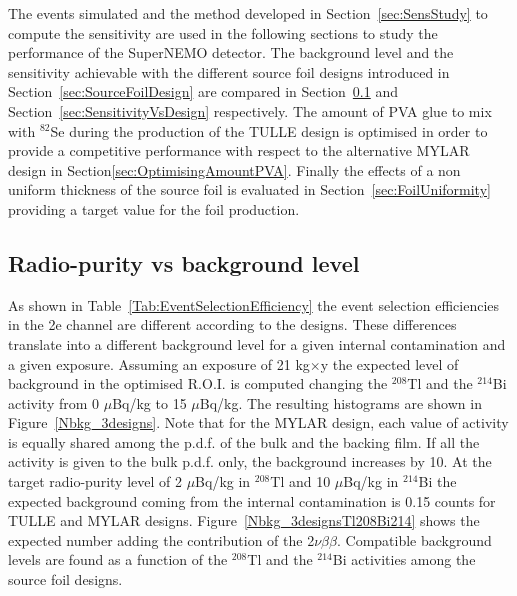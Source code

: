 \documentclass[main.tex]{subfiles}
\begin{document}
\NI The events simulated and the method developed in Section~\ref{sec:SensStudy} to compute the sensitivity are used in the following sections to study the performance of the SuperNEMO detector. The background level and the sensitivity achievable with the different source foil designs introduced in Section~\ref{sec:SourceFoilDesign} are compared in Section~\ref{sec:RadiopurityVsBkg} and Section~\ref{sec:SensitivityVsDesign} respectively. The amount of PVA glue to mix with $^{\text{82}}$Se during the production of the TULLE design is optimised in order to provide a competitive performance with respect to the alternative MYLAR design in Section\ref{sec:OptimisingAmountPVA}. Finally the effects of a non uniform thickness of the source foil is evaluated in Section~\ref{sec:FoilUniformity} providing a target value for the foil production.



\subsection{Radio-purity vs background level}\label{sec:RadiopurityVsBkg}


\NI As shown in Table~\ref{Tab:EventSelectionEfficiency} the event selection efficiencies in the 2e channel are different according to the designs. These differences translate into a different background level for a given internal contamination and a given exposure. Assuming an exposure of 21 kg$\times$y the expected level of background in the optimised R.O.I. is computed changing the $^{\text{208}}$Tl and the $^{\text{214}}$Bi activity from 0 $\mu$Bq/kg to 15 $\mu$Bq/kg. The resulting histograms are shown in Figure~\ref{Nbkg_3designs}. Note that for the MYLAR design, each value of activity is equally shared among the p.d.f. of the bulk and the backing film. If all the activity is given to the bulk p.d.f. only, the background increases by 10. At the target radio-purity level of 2 $\mu$Bq/kg in $^{\text{208}}$Tl and 10 $\mu$Bq/kg in $^{\text{214}}$Bi the expected background coming from the internal contamination is 0.15 counts for TULLE and MYLAR designs. Figure~\ref{Nbkg_3designsTl208Bi214} shows the expected number adding the contribution of the 2$\nu\beta\beta$. Compatible background levels are found as a function of the $^{\text{208}}$Tl and the $^{\text{214}}$Bi activities among the source foil designs.
\end{document}

